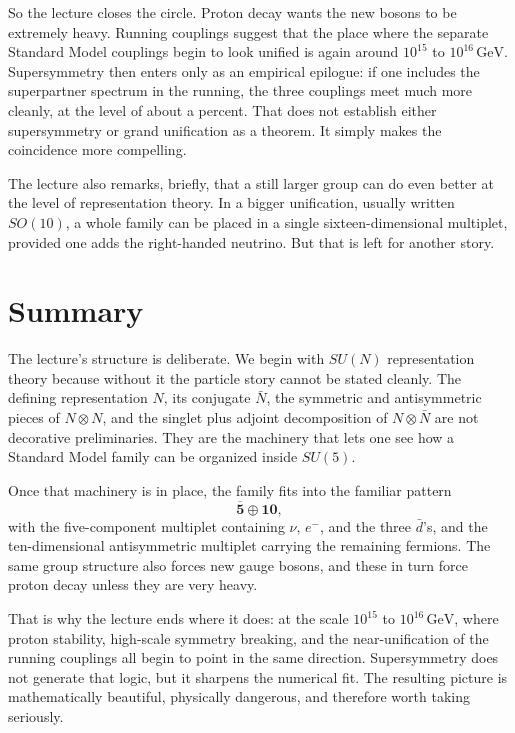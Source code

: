So the lecture closes the circle. Proton decay wants the new bosons to be extremely heavy. Running couplings suggest that the place where the separate Standard Model couplings begin to look unified is again around \(10^{15}\) to \(10^{16}\,\mathrm{GeV}\). Supersymmetry then enters only as an empirical epilogue: if one includes the superpartner spectrum in the running, the three couplings meet much more cleanly, at the level of about a percent. That does not establish either supersymmetry or grand unification as a theorem. It simply makes the coincidence more compelling.

The lecture also remarks, briefly, that a still larger group can do even better at the level of representation theory. In a bigger unification, usually written \(SO(10)\), a whole family can be placed in a single sixteen-dimensional multiplet, provided one adds the right-handed neutrino. But that is left for another story.

\section{Summary}

The lecture's structure is deliberate. We begin with \(SU(N)\) representation theory because without it the particle story cannot be stated cleanly. The defining representation \(N\), its conjugate \(\bar N\), the symmetric and antisymmetric pieces of \(N\otimes N\), and the singlet plus adjoint decomposition of \(N\otimes \bar N\) are not decorative preliminaries. They are the machinery that lets one see how a Standard Model family can be organized inside \(SU(5)\).

Once that machinery is in place, the family fits into the familiar pattern
\[
\overline{\mathbf 5}\oplus \mathbf{10},
\]
with the five-component multiplet containing \(\nu\), \(e^-\), and the three \(\bar d\)'s, and the ten-dimensional antisymmetric multiplet carrying the remaining fermions. The same group structure also forces new gauge bosons, and these in turn force proton decay unless they are very heavy.

That is why the lecture ends where it does: at the scale \(10^{15}\) to \(10^{16}\,\mathrm{GeV}\), where proton stability, high-scale symmetry breaking, and the near-unification of the running couplings all begin to point in the same direction. Supersymmetry does not generate that logic, but it sharpens the numerical fit. The resulting picture is mathematically beautiful, physically dangerous, and therefore worth taking seriously.